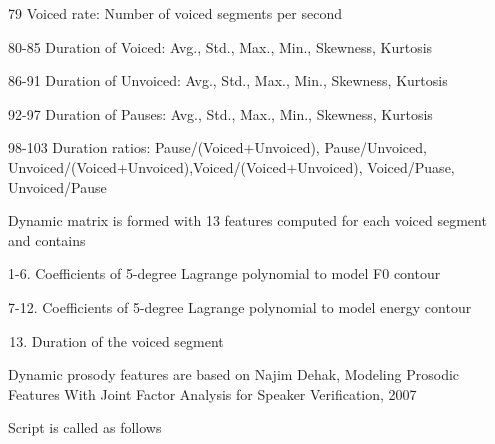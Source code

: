 \documentclass[letterpaper,10pt,english]{sphinxmanual}
\begin{document}
\begin{fulllineitems}
79      Voiced rate:                                                      Number of voiced segments per second

80-85   Duration of Voiced:                                               Avg., Std., Max., Min., Skewness, Kurtosis

86-91   Duration of Unvoiced:                                             Avg., Std., Max., Min., Skewness, Kurtosis

92-97   Duration of Pauses:                                               Avg., Std., Max., Min., Skewness, Kurtosis

98-103  Duration ratios:                                                 Pause/(Voiced+Unvoiced), Pause/Unvoiced, Unvoiced/(Voiced+Unvoiced),Voiced/(Voiced+Unvoiced), Voiced/Puase, Unvoiced/Pause

Dynamic matrix is formed with 13 features computed for each voiced segment and contains

1-6. Coefficients of 5-degree Lagrange polynomial to model F0 contour

7-12. Coefficients of 5-degree Lagrange polynomial to model energy contour
\begin{enumerate}
\setcounter{enumi}{12}
\item {} 
Duration of the voiced segment

\end{enumerate}

Dynamic prosody features are based on
Najim Dehak, \sphinxquotedblleft{}Modeling Prosodic Features With Joint Factor Analysis for Speaker Verification\sphinxquotedblright{}, 2007

Script is called as follows

\begin{sphinxVerbatim}[commandchars=\\\{\}]
                 
\end{sphinxVerbatim}


\end{fulllineitems}
\end{document}
